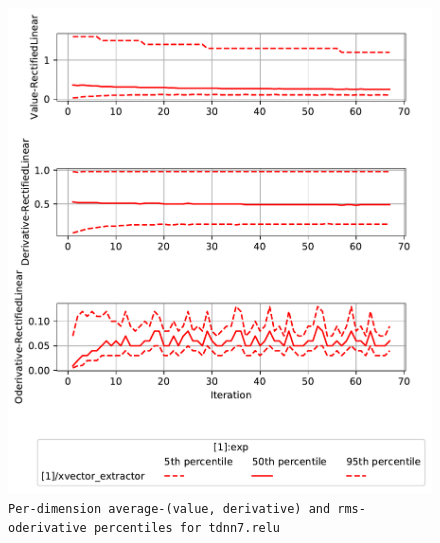 \documentclass[prl,10pt,twocolumn]{revtex4}
\begin{document}
\newpage
\begin{figure}[h]
  \begin{center}
    \caption{\texttt{Per-dimension average-(value, derivative) and rms-oderivative percentiles for tdnn7.relu}}
    \includegraphics[width=\textwidth]{exp/xvector_extractor/report/nonlinstats_tdnn7_dot_relu.pdf}
  \end{center}
\end{figure}
\clearpage
\end{document}
